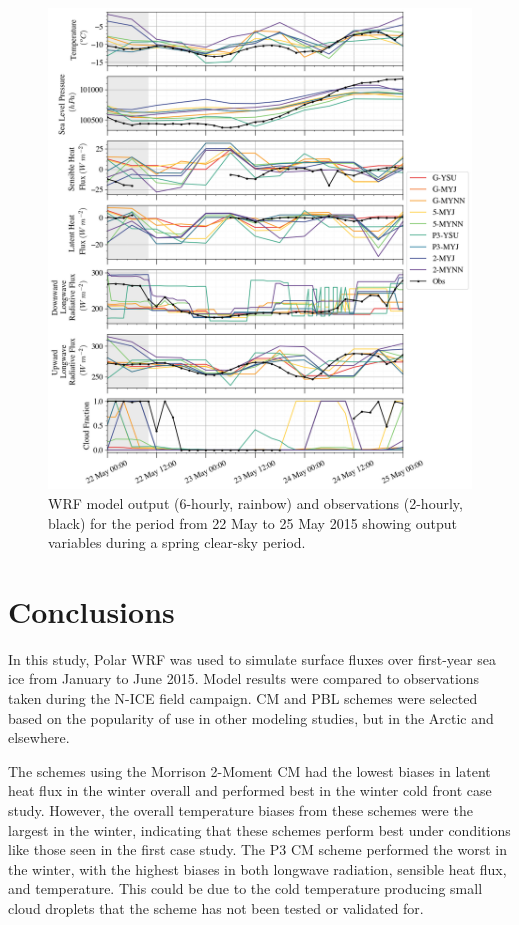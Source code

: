 \begin{figure}[p]
    \centering
    \includegraphics[width=1\linewidth]{figures/chapter3/wrf_case2.png}
    \caption[Polar WRF Case 3 - Spring clear-sky (23 May 2015) timeseries]{WRF model output (6-hourly, rainbow) and observations (2-hourly, black) for the period from 22 May to 25 May 2015 showing output variables during a spring clear-sky period.}
    \label{fig:wrf_case2}
\end{figure}

\section{Conclusions}

In this study, Polar WRF was used to simulate surface fluxes over first-year sea ice from January to June 2015. Model results were compared to observations taken during the N-ICE field campaign. CM and PBL schemes were selected based on the popularity of use in other modeling studies, but in the Arctic and elsewhere. 

The schemes using the Morrison 2-Moment CM had the lowest biases in latent heat flux in the winter overall and performed best in the winter cold front case study. However, the overall temperature biases from these schemes were the largest in the winter, indicating that these schemes perform best under conditions like those seen in the first case study. The P3 CM scheme performed the worst in the winter, with the highest biases in both longwave radiation, sensible heat flux, and temperature. This could be due to the cold temperature producing small cloud droplets that the scheme has not been tested or validated for. 

